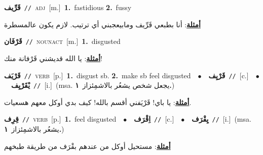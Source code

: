 \documentclass[10pt,a4paper,twoside]{article} %
\begin{document}
\begin{multicols}{2}
{\setlength\topsep{0pt}\textbf{\foreignlanguage{arabic}{قَرِّيف}}\ {\color{gray}\texttt{//}\color{black}}\ \textsc{adj}\ [m.]\ \textbf{1.}~fastidious  \textbf{2.}~fussy\  \begin{flushright}\color{gray}\foreignlanguage{arabic}{\textbf{\underline{\foreignlanguage{arabic}{أمثلة}}}: أنا بطبعي قَرِّيف ومابيعجبني أي ترتيب. لازم يكون عالمسطرة}\end{flushright}\color{black}} \vspace{2mm}

{\setlength\topsep{0pt}\textbf{\foreignlanguage{arabic}{قَرْفَان}}\ {\color{gray}\texttt{//}\color{black}}\ \textsc{noun\textunderscore act}\ [m.]\ \textbf{1.}~disgusted\  \begin{flushright}\color{gray}\foreignlanguage{arabic}{\textbf{\underline{\foreignlanguage{arabic}{أمثلة}}}: يا الله قديشني قَرْفانة منك!}\end{flushright}\color{black}} \vspace{2mm}

{\setlength\topsep{0pt}\textbf{\foreignlanguage{arabic}{قَرْيَف}}\ {\color{gray}\texttt{//}\color{black}}\ \textsc{verb}\ [p.]\ \textbf{1.}~disgust sb.  \textbf{2.}~make sb feel disgusted\ \ $\bullet$\ \ \setlength\topsep{0pt}\textbf{\foreignlanguage{arabic}{قَرْيِف}}\ {\color{gray}\texttt{//}\color{black}}\ [c.]\ \ $\bullet$\ \ \setlength\topsep{0pt}\textbf{\foreignlanguage{arabic}{يْقَرْيِف}}\ {\color{gray}\texttt{//}\color{black}}\ [i.]\ \color{gray}(msa. \foreignlanguage{arabic}{يجعل شخص يشعُر بالاشمِئزاز}~\foreignlanguage{arabic}{\textbf{١.}})\color{black}\  \begin{flushright}\color{gray}\foreignlanguage{arabic}{\textbf{\underline{\foreignlanguage{arabic}{أمثلة}}}: يا باي! قَرْيَفني أقسم بالله! كيف بدي أوكل معهم هسعيات.}\end{flushright}\color{black}} \vspace{2mm}

{\setlength\topsep{0pt}\textbf{\foreignlanguage{arabic}{قِرِف}}\ {\color{gray}\texttt{//}\color{black}}\ \textsc{verb}\ [p.]\ \textbf{1.}~feel disgusted\ \ $\bullet$\ \ \setlength\topsep{0pt}\textbf{\foreignlanguage{arabic}{اِقْرَف}}\ {\color{gray}\texttt{//}\color{black}}\ [c.]\ \ $\bullet$\ \ \setlength\topsep{0pt}\textbf{\foreignlanguage{arabic}{يِقْرَف}}\ {\color{gray}\texttt{//}\color{black}}\ [i.]\ \color{gray}(msa. \foreignlanguage{arabic}{يشعُر بالاشمِئزاز}~\foreignlanguage{arabic}{\textbf{١.}})\color{black}\  \begin{flushright}\color{gray}\foreignlanguage{arabic}{\textbf{\underline{\foreignlanguage{arabic}{أمثلة}}}: مستحيل أوكل من عندهم بقْرَف من طريقة طبخهم}\end{flushright}\color{black}} \vspace{2mm}


\end{multicols}
\end{document}
